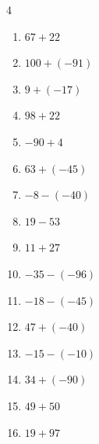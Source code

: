 \begin{multicols}{4}
\begin{enumerate}
        \phantom{$=31$}

  \item $67+22$

        \phantom{$=89$}

  \item $100+(-91)$

        \phantom{$=9$}

  \item $9+(-17)$

        \phantom{$=-8$}

  \item $98+22$

        \phantom{$=120$}

  \item $-90+4$

        \phantom{$=-86$}

  \item $63+(-45)$

        \phantom{$=18$}

  \item $-8-(-40)$

        \phantom{$=32$}

  \item $19-53$

        \phantom{$=-34$}

  \item $11+27$

        \phantom{$=38$}

  \item $-35-(-96)$

        \phantom{$=61$}

  \item $-18-(-45)$

        \phantom{$=27$}

\columnbreak %

  \item $47+(-40)$

        \phantom{$=7$}

  \item $-15-(-10)$

        \phantom{$=-5$}

  \item $34+(-90)$

        \phantom{$=-56$}

  \item $49+50$

        \phantom{$=99$}

  \item $19+97$


\end{enumerate}
\end{multicols}
